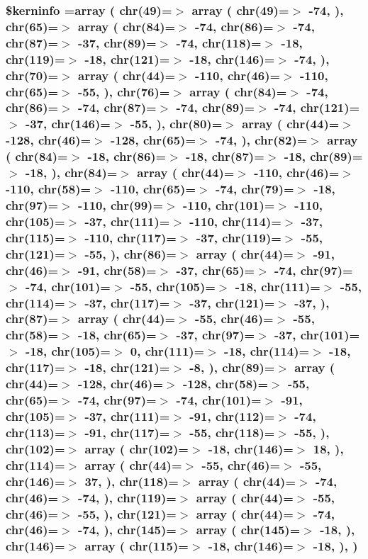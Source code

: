 \hypertarget{chelvetica_8php_ab4bb7d3b0332c517f6a42a1924f01000}{
\subsubsection[{\$kerninfo}]{\setlength{\rightskip}{0pt plus 5cm}\$kerninfo =array ( chr(49)=$>$ array ( chr(49)=$>$ -\/74, ), chr(65)=$>$ array ( chr(84)=$>$ -\/74, chr(86)=$>$ -\/74, chr(87)=$>$ -\/37, chr(89)=$>$ -\/74, chr(118)=$>$ -\/18, chr(119)=$>$ -\/18, chr(121)=$>$ -\/18, chr(146)=$>$ -\/74, ), chr(70)=$>$ array ( chr(44)=$>$ -\/110, chr(46)=$>$ -\/110, chr(65)=$>$ -\/55, ), chr(76)=$>$ array ( chr(84)=$>$ -\/74, chr(86)=$>$ -\/74, chr(87)=$>$ -\/74, chr(89)=$>$ -\/74, chr(121)=$>$ -\/37, chr(146)=$>$ -\/55, ), chr(80)=$>$ array ( chr(44)=$>$ -\/128, chr(46)=$>$ -\/128, chr(65)=$>$ -\/74, ), chr(82)=$>$ array ( chr(84)=$>$ -\/18, chr(86)=$>$ -\/18, chr(87)=$>$ -\/18, chr(89)=$>$ -\/18, ), chr(84)=$>$ array ( chr(44)=$>$ -\/110, chr(46)=$>$ -\/110, chr(58)=$>$ -\/110, chr(65)=$>$ -\/74, chr(79)=$>$ -\/18, chr(97)=$>$ -\/110, chr(99)=$>$ -\/110, chr(101)=$>$ -\/110, chr(105)=$>$ -\/37, chr(111)=$>$ -\/110, chr(114)=$>$ -\/37, chr(115)=$>$ -\/110, chr(117)=$>$ -\/37, chr(119)=$>$ -\/55, chr(121)=$>$ -\/55, ), chr(86)=$>$ array ( chr(44)=$>$ -\/91, chr(46)=$>$ -\/91, chr(58)=$>$ -\/37, chr(65)=$>$ -\/74, chr(97)=$>$ -\/74, chr(101)=$>$ -\/55, chr(105)=$>$ -\/18, chr(111)=$>$ -\/55, chr(114)=$>$ -\/37, chr(117)=$>$ -\/37, chr(121)=$>$ -\/37, ), chr(87)=$>$ array ( chr(44)=$>$ -\/55, chr(46)=$>$ -\/55, chr(58)=$>$ -\/18, chr(65)=$>$ -\/37, chr(97)=$>$ -\/37, chr(101)=$>$ -\/18, chr(105)=$>$ 0, chr(111)=$>$ -\/18, chr(114)=$>$ -\/18, chr(117)=$>$ -\/18, chr(121)=$>$ -\/8, ), chr(89)=$>$ array ( chr(44)=$>$ -\/128, chr(46)=$>$ -\/128, chr(58)=$>$ -\/55, chr(65)=$>$ -\/74, chr(97)=$>$ -\/74, chr(101)=$>$ -\/91, chr(105)=$>$ -\/37, chr(111)=$>$ -\/91, chr(112)=$>$ -\/74, chr(113)=$>$ -\/91, chr(117)=$>$ -\/55, chr(118)=$>$ -\/55, ), chr(102)=$>$ array ( chr(102)=$>$ -\/18, chr(146)=$>$ 18, ), chr(114)=$>$ array ( chr(44)=$>$ -\/55, chr(46)=$>$ -\/55, chr(146)=$>$ 37, ), chr(118)=$>$ array ( chr(44)=$>$ -\/74, chr(46)=$>$ -\/74, ), chr(119)=$>$ array ( chr(44)=$>$ -\/55, chr(46)=$>$ -\/55, ), chr(121)=$>$ array ( chr(44)=$>$ -\/74, chr(46)=$>$ -\/74, ), chr(145)=$>$ array ( chr(145)=$>$ -\/18, ), chr(146)=$>$ array ( chr(115)=$>$ -\/18, chr(146)=$>$ -\/18, ), )}}\label{chelvetica_8php_ab4bb7d3b0332c517f6a42a1924f01000}


